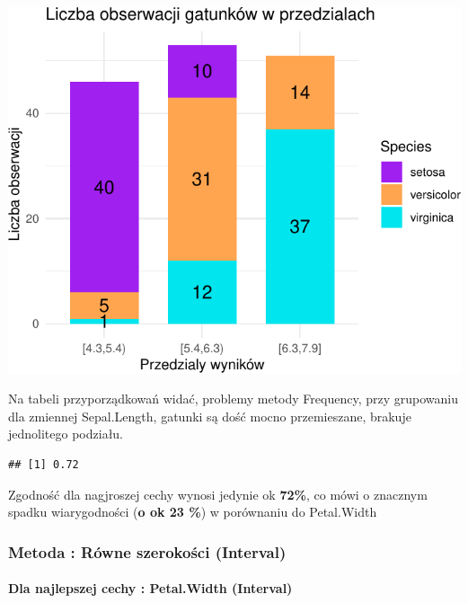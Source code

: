 \documentclass[
  12pt,
]{article}
\begin{document}
\begin{center}\includegraphics{Sprawozdanie2_files/figure-latex/tabela_kondygnacji_1_najg-1} \end{center}

Na tabeli przyporządkowań widać, problemy metody Frequency, przy
grupowaniu dla zmiennej Sepal.Length, gatunki są dość mocno
przemieszane, brakuje jednolitego podziału.

\begin{verbatim}
## [1] 0.72
\end{verbatim}

Zgodność dla nagjroszej cechy wynosi jedynie ok \textbf{72\%}, co mówi o
znacznym spadku wiarygodności (\textbf{o ok 23 \%}) w porównaniu do
Petal.Width

\subsubsection{Metoda : Równe szerokości
(Interval)}\label{metoda-ruxf3wne-szerokoux15bci-interval}

\paragraph{Dla najlepszej cechy : Petal.Width
(Interval)}\label{dla-najlepszej-cechy-petal.width-interval}
\end{document}
